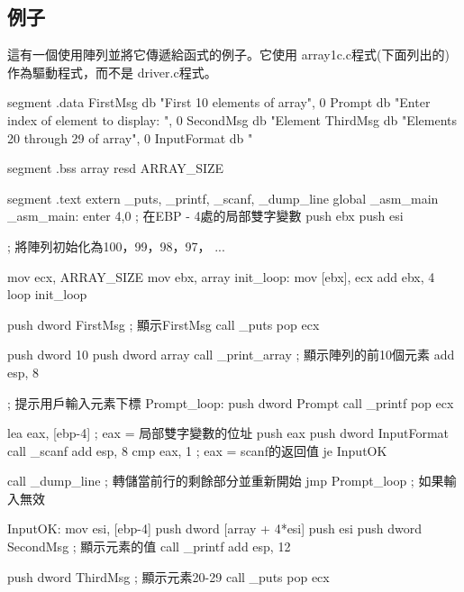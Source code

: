 \subsection{例子}
這有一個使用陣列並將它傳遞給函式的例子。它使用
{\code array1c.c}程式(下面列出的)作為驅動程式，而不是
{\code driver.c}程式。 
\begin{AsmCodeListing}[label=array1.asm]

segment .data
FirstMsg        db   "First 10 elements of array", 0
Prompt          db   "Enter index of element to display: ", 0
SecondMsg       db   "Element %
ThirdMsg        db   "Elements 20 through 29 of array", 0
InputFormat     db   "%

segment .bss
array           resd ARRAY_SIZE

segment .text
        extern  _puts, _printf, _scanf, _dump_line
        global  _asm_main
_asm_main:
        enter   4,0     ; 在EBP - 4處的局部雙字變數
        push    ebx
        push    esi

; 將陣列初始化為100，99，98，97， ...

        mov     ecx, ARRAY_SIZE
        mov     ebx, array
init_loop:
        mov     [ebx], ecx
        add     ebx, 4
        loop    init_loop

        push    dword FirstMsg         ; 顯示FirstMsg
        call    _puts
        pop     ecx

        push    dword 10
        push    dword array
        call    _print_array           ; 顯示陣列的前10個元素
        add     esp, 8

; 提示用戶輸入元素下標
Prompt_loop:
        push    dword Prompt
        call    _printf
        pop     ecx

        lea     eax, [ebp-4]      ; eax = 局部雙字變數的位址
        push    eax
        push    dword InputFormat
        call    _scanf
        add     esp, 8
        cmp     eax, 1               ; eax = scanf的返回值
        je      InputOK

        call    _dump_line  ; 轉儲當前行的剩餘部分並重新開始
        jmp     Prompt_loop          ; 如果輸入無效

InputOK:
        mov     esi, [ebp-4]
        push    dword [array + 4*esi]
        push    esi
        push    dword SecondMsg      ; 顯示元素的值
        call    _printf
        add     esp, 12

        push    dword ThirdMsg       ; 顯示元素20-29
        call    _puts
        pop     ecx


\end{AsmCodeListing}
